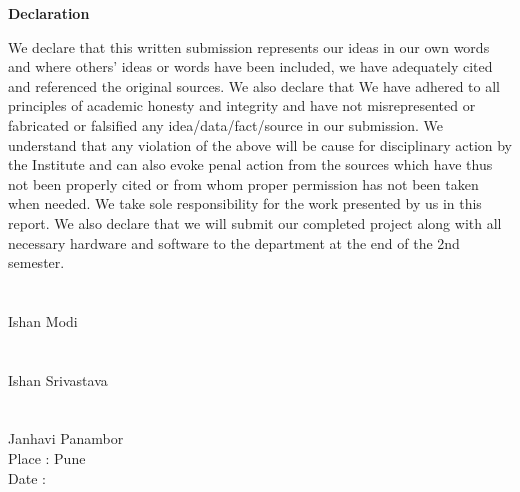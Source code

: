\begin{center}
{\huge \bf Declaration}
\end{center}

We declare that this written submission represents our ideas in our own words and where others' ideas or words have been included, we have adequately cited and referenced the original sources. We also declare that We have adhered to all principles of academic honesty and integrity and have not misrepresented or fabricated or falsified any idea/data/fact/source in our submission. We understand that any violation of the above will be cause for disciplinary action by the Institute and can also evoke penal action from the sources which have thus not been properly cited or from whom proper permission has not been taken when needed. We take sole responsibility for the work presented by us in this report. We also declare that we will submit our completed project along with all necessary hardware and software to the department at the end of the 2nd semester.\\\\
\\
Ishan Modi\\ 
\\
\\ 
Ishan Srivastava\\ 
\\
\\
Janhavi Panambor\\


\noindent Place : Pune \\
Date :


